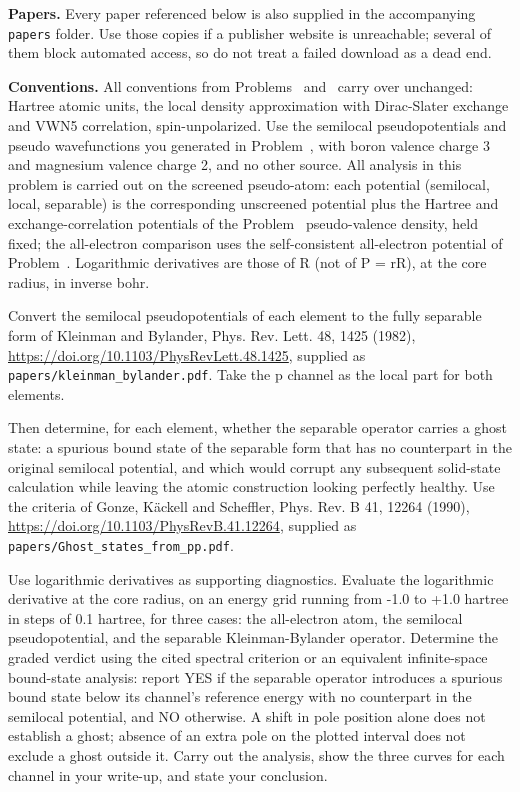 \textbf{Papers.} Every paper referenced below is also supplied in the accompanying \texttt{papers} folder. Use
those copies if a publisher website is unreachable; several of them block automated access, so do not treat a
failed download as a dead end.

\textbf{Conventions.} All conventions from Problems~ and~ carry over unchanged: Hartree atomic units, the
local density approximation with Dirac-Slater exchange and VWN5 correlation, spin-unpolarized. Use the
semilocal pseudopotentials and pseudo wavefunctions you generated in Problem~, with boron valence charge 3
and magnesium valence charge 2, and no other source. All analysis in this problem is carried out on the
screened pseudo-atom: each potential (semilocal, local, separable) is the corresponding unscreened potential
plus the Hartree and exchange-correlation potentials of the Problem~ pseudo-valence density, held fixed; the
all-electron comparison uses the self-consistent all-electron potential of Problem~. Logarithmic derivatives
are those of R (not of P = rR), at the core radius, in inverse bohr.


Convert the semilocal pseudopotentials of each element to the fully separable form of Kleinman and Bylander,
Phys. Rev. Lett. 48, 1425 (1982), \url{https://doi.org/10.1103/PhysRevLett.48.1425}, supplied as
\texttt{papers/kleinman\_bylander.pdf}. Take the p channel as the local part for both elements.

Then determine, for each element, whether the separable operator carries a ghost state: a spurious bound state
of the separable form that has no counterpart in the original semilocal potential, and which would corrupt any
subsequent solid-state calculation while leaving the atomic construction looking perfectly healthy. Use the
criteria of Gonze, K\"ackell and Scheffler, Phys. Rev. B 41, 12264 (1990),
\url{https://doi.org/10.1103/PhysRevB.41.12264}, supplied as \texttt{papers/Ghost\_states\_from\_pp.pdf}.

Use logarithmic derivatives as supporting diagnostics. Evaluate the logarithmic derivative at the core
radius, on an energy grid running from -1.0 to +1.0 hartree in steps of 0.1 hartree, for three cases: the
all-electron atom, the semilocal pseudopotential, and the separable Kleinman-Bylander operator. Determine the graded verdict using the cited spectral criterion or an equivalent infinite-space
bound-state analysis: report YES if the separable operator introduces a spurious bound state below its
channel's reference energy with no counterpart in the semilocal potential, and NO otherwise. A shift in pole
position alone does not establish a ghost; absence of an extra pole on the plotted interval does not exclude
a ghost outside it. Carry
out the analysis, show the three curves for each channel in your write-up, and state your conclusion.


